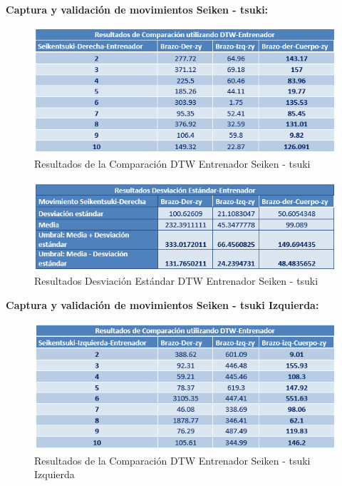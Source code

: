 \textbf{Captura y validación de movimientos Seiken - tsuki:}\\
\begin{figure}[H]%
	\begin{center}
		\includegraphics[scale=1]{./Figuras/Implementacion/Pruebas/Tablas/ResultadosDTW_Entrenador_Seikentsuki}
	\end{center}
	\caption{Resultados de la Comparación DTW Entrenador Seiken - tsuki}
	\label{fig:ResultadosDTW_Entrenador_Seikentsuki}
\end{figure}
\begin{figure}[H]%
	\begin{center}
		\includegraphics[scale=1]{./Figuras/Implementacion/Pruebas/Tablas/ResultadorDesvEstandar_Entrenador_Seikentsuki}
	\end{center}
	\caption{Resultados Desviación Estándar DTW Entrenador Seiken - tsuki}
	\label{fig:ResultadosDTW_Entrenador_Seikentsuki}
\end{figure}
\textbf{Captura y validación de movimientos Seiken - tsuki Izquierda:}\\
\begin{figure}[H]%
	\begin{center}
		\includegraphics[scale=1]{./Figuras/Implementacion/Pruebas/Tablas/ResultadosDTW_Entrenador_Seikentsuki-Izquierdo}
	\end{center}
	\caption{Resultados de la Comparación DTW Entrenador Seiken - tsuki Izquierda}
	\label{fig:ResultadosDTW_Entrenador_Seikentsuki-Izquierdo}
\end{figure}

